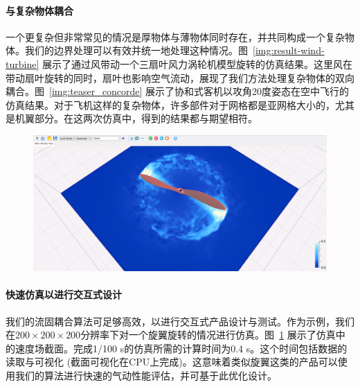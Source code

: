 \paragraph{与复杂物体耦合}
一个更复杂但非常常见的情况是厚物体与薄物体同时存在，并共同构成一个复杂物体。我们的边界处理可以有效并统一地处理这种情况。图~\ref{img:result-wind-turbine} 展示了通过风带动一个三扇叶风力涡轮机模型旋转的仿真结果。这里风在带动扇叶旋转的同时，扇叶也影响空气流动，展现了我们方法处理复杂物体的双向耦合。图~\ref{img:teaser_concorde} 展示了协和式客机以攻角20度姿态在空中飞行的仿真结果。对于飞机这样的复杂物体，许多部件对于网格都是亚网格大小的，尤其是机翼部分。在这两次仿真中，得到的结果都与期望相符。

\begin{figure}[!htbp]
  \centering
    \includegraphics[width=0.99\columnwidth]{figures/result_design.png}
  \label{img:result-design}
\end{figure}

\paragraph{快速仿真以进行交互式设计}
我们的流固耦合算法可足够高效，以进行交互式产品设计与测试。作为示例，我们在$200\!\times\!200\!\times\!200$分辨率下对一个旋翼旋转的情况进行仿真。图~\ref{img:result-design} 展示了仿真中的速度场截面。完成1/100 s的仿真所需的计算时间为0.4 s。这个时间包括数据的读取与可视化 (截面可视化在CPU上完成)。这意味着类似旋翼这类的产品可以使用我们的算法进行快速的气动性能评估，并可基于此优化设计。

